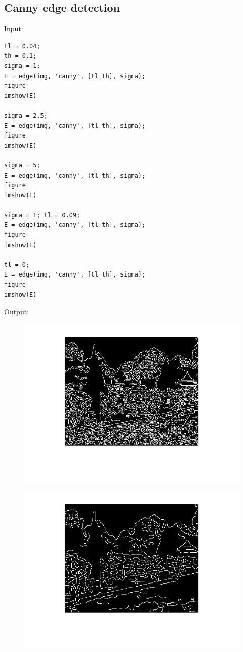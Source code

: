 \documentclass[12pt, a4paper]{article}
\begin{document}
\subsection{Canny edge detection}
Input:
\begin{verbatim}
tl = 0.04;
th = 0.1;
sigma = 1;
E = edge(img, 'canny', [tl th], sigma);
figure
imshow(E)

sigma = 2.5;
E = edge(img, 'canny', [tl th], sigma);
figure
imshow(E)

sigma = 5;
E = edge(img, 'canny', [tl th], sigma);
figure
imshow(E)

sigma = 1; tl = 0.09;
E = edge(img, 'canny', [tl th], sigma);
figure
imshow(E)

tl = 0;
E = edge(img, 'canny', [tl th], sigma);
figure
imshow(E)
\end{verbatim}
\newpage
Output:
\begin{figure}[H]
	\centering
	\includegraphics[width=\textwidth]{fig9.png}
\end{figure}
\vspace{-20mm}
\begin{figure}[H]
	\centering
	\includegraphics[width=\textwidth]{fig10.png}
\end{figure}
\end{document}
